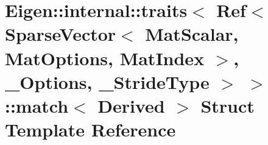 \hypertarget{struct_eigen_1_1internal_1_1traits_3_01_ref_3_01_sparse_vector_3_01_mat_scalar_00_01_mat_options4b581d834744f71c5c7313d6641690e6}{}\section{Eigen\+:\+:internal\+:\+:traits$<$ Ref$<$ Sparse\+Vector$<$ Mat\+Scalar, Mat\+Options, Mat\+Index $>$, \+\_\+\+Options, \+\_\+\+Stride\+Type $>$ $>$\+:\+:match$<$ Derived $>$ Struct Template Reference}
\label{struct_eigen_1_1internal_1_1traits_3_01_ref_3_01_sparse_vector_3_01_mat_scalar_00_01_mat_options4b581d834744f71c5c7313d6641690e6}
